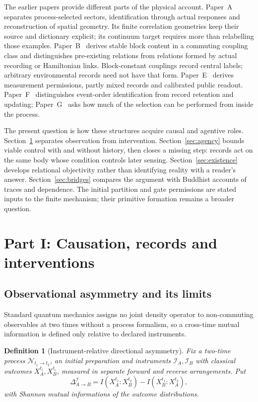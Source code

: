 \documentclass[11pt,a4paper]{article}
\newtheorem{definition}{Definition}[section]
\begin{document}
The earlier papers provide different parts of the physical account.
Paper~A~\cite{Liu2026PaperA} separates process-selected sectors,
identification through actual responses and reconstruction of spatial
geometry. Its finite correlation geometries keep their source and
dictionary explicit; its continuum target requires more than relabelling
those examples.
Paper~B~\cite{Liu2026PaperB} derives stable block content in a commuting
coupling class and distinguishes pre-existing relations from relations
formed by actual recording or Hamiltonian links. Block-constant couplings
record central labels; arbitrary environmental records need not have that
form. Paper~E~\cite{Liu2026PaperE} derives measurement permissions,
partly mixed records and calibrated public readout. Paper~F~\cite{Liu2026PaperF}
distinguishes event-order identification from record retention and updating; Paper~G~\cite{Liu2026PaperG}
asks how much of the selection can be performed from inside the process.

The present question is how these structures acquire causal and agentive
roles. Section~\ref{sec:causation} separates observation from intervention.
Section~\ref{sec:agency} bounds viable control with and without history,
then closes a missing step: records act on the same body whose condition
controls later sensing. Section~\ref{sec:existence} develops relational
objectivity rather than identifying reality with a reader's answer.
Section~\ref{sec:bridges} compares the argument with Buddhist accounts of
traces and dependence. The initial partition and gate permissions are
stated inputs to the finite mechanism; their primitive formation remains
a broader question.

\section{Part I: Causation, records and interventions}
\label{sec:causation}

\subsection{Observational asymmetry and its limits}

Standard quantum mechanics assigns no joint density operator to non-commuting observables at two times without a process formalism, so a cross-time mutual information is defined only relative to declared instruments.

\begin{definition}[Instrument-relative directional asymmetry]
\label{def:asym}
Fix a two-time process $\mathcal N_{t_1\to t_2}$, an initial preparation and instruments $\mathcal I_A,\mathcal I_B$ with classical outcomes $X_A^{t_i},X_B^{t_i}$, measured in separate forward and reverse arrangements. Put
\[
\Delta^{\mathcal I}_{A\to B}=I(X_A^{t_1}:X_B^{t_2})-I(X_B^{t_1}:X_A^{t_2}),
\]
with Shannon mutual informations of the outcome distributions.
\end{definition}
\end{document}
